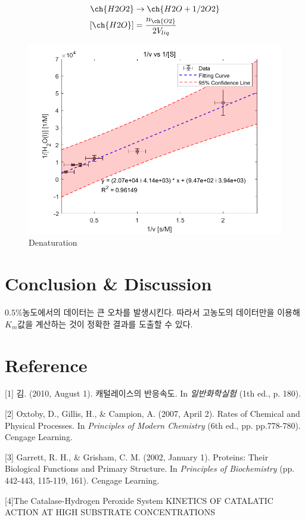 \documentclass[%
 reprint,
 amsmath,amssymb,
 aps,
]{revtex4-2}
\begin{document}
\begin{align}
	\ch{H2O2} &\rightarrow \ch{H2O + 1/2 O2}\\
	[\ch{H2O}] &= \frac{n_{\ch{O2}}}{2V_{liq}}
\end{align}

\begin{figure}[htbp]
	\includegraphics[width = 1.0\linewidth]{TOT.png}%
	\caption{\label{fig:TOT}Denaturation}
\end{figure}

\section{\label{sec:level1}Conclusion \& Discussion}
$0.5\%$농도에서의 데이터는 큰 오차를 발생시킨다. 따라서 고농도의 데이터만을 이용해 $K_{m}$값을 계산하는 것이 정확한 결과를 도출할 수 있다. 

\section{\label{sec:level1}Reference}
[1] 김. (2010, August 1). 캐털레이스의 반응속도. In \textit{일반화학실험} (1th ed., p. 180).

[2] Oxtoby, D., Gillis, H., \& Campion, A. (2007, April 2). Rates of Chemical and Physical Processes. In \textit{Principles of Modern Chemistry} (6th ed., pp. pp.778-780). Cengage Learning.

[3] Garrett, R. H., \& Grisham, C. M. (2002, January 1). Proteins: Their Biological Functions and Primary Structure. In \textit{Principles of Biochemistry} (pp. 442-443, 115-119, 161). Cengage Learning.

[4]The Catalase-Hydrogen Peroxide System
KINETICS OF CATALATIC ACTION AT HIGH SUBSTRATE CONCENTRATIONS
\end{document}
